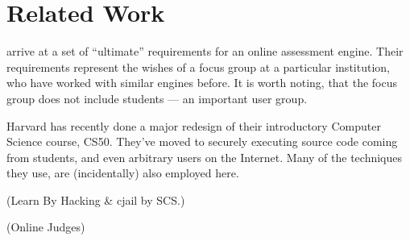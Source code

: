 
\section{Related Work}

\cite{sclater-howie-2003}  arrive at a set of ``ultimate'' requirements for an
online assessment engine. Their requirements represent the wishes of a focus
group at a particular institution, who have worked with similar engines before.
It is worth noting, that the focus group does not include students --- an
important user group.

Harvard has recently done a major redesign of their introductory Computer
Science course, CS50\cite{malan-2010a}. They've moved to securely executing
source code coming from students, and even arbitrary users on the
Internet\cite{malan-2010b,malan-2013}. Many of the techniques they use, are
(incidentally) also employed here.

(Learn By Hacking \& cjail by SCS.)

(Online Judges)
